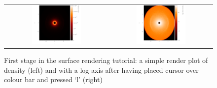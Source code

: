 \documentclass[a4paper,11pt]{article}
\begin{document}
\begin{figure}[h]
\begin{center}
\begin{tabular}{cc}
\includegraphics[width=0.5\textwidth]{surfpart1.png} &
\includegraphics[width=0.5\textwidth]{surfpart2.png}
\end{tabular}
\caption{First stage in the surface rendering tutorial: a simple render plot of density (left) and with a log axis after having placed cursor over colour bar and pressed `l' (right)}
\label{fig:surfpart1}
\end{center}
\end{figure}
\end{document}
